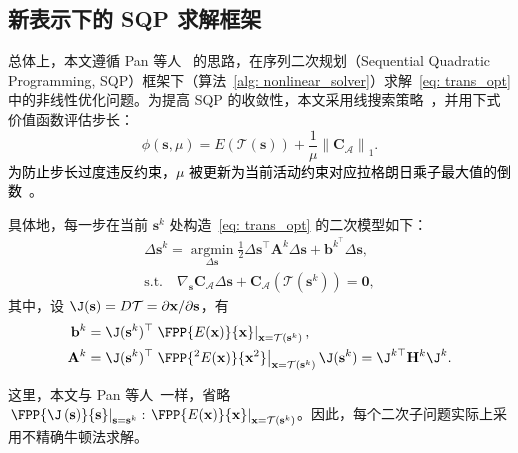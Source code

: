 \subsection{新表示下的 SQP 求解框架}
总体上，本文遵循 Pan 等人~\cite{pan_subspace_2015} 的思路，在序列二次规划（Sequential Quadratic Programming, SQP）框架下（算法~\ref{alg: nonlinear_solver}）求解~\cref{eq: trans_opt} 中的非线性优化问题。为提高 SQP 的收敛性，本文采用线搜索策略~\cite{nocedal1999numerical}，并用下式价值函数评估步长：
\begin{equation}
   \phi(\mathbf{s}, \mu) = E(\mathcal{T}(\mathbf{s})) + \frac{1}{\mu}\left\|\mathbf{C}_{\mathcal{A}} \right\|_{1}.
   \label{eq:merit_function}
\end{equation}
\textcolor{black}{
为防止步长过度违反约束，$\mu$ 被更新为当前活动约束对应拉格朗日乘子最大值的倒数~\cite{nocedal1999numerical}}。

具体地，每一步在当前 $\mathbf s^k$ 处构造~\cref{eq: trans_opt} 的二次模型如下：
\begin{equation}
\begin{gathered}
    \Delta {\mathbf{s}}^k =\mathop{\arg \min}\limits_{\Delta \mathbf s}
    \frac{1}{2}\Delta{\mathbf{s}}^{\top} \mathbf{A}^k \Delta {\mathbf{s}} +
    \mathbf{b}^{k^\top} \Delta {\mathbf{s}},\\
    \text{s.t.} \quad
    \nabla_{{\mathbf{s}}}\mathbf{C_{\mathcal A}}  \Delta{\mathbf{s}} + \mathbf{C_{\mathcal A}}(\mathcal{T}({\mathbf{s}}^k )) = \mathbf{0},
  \label{eq: quad_opt}
  \end{gathered}
\end{equation}
其中，设 $\J(\mathbf{s}) = D \mathcal{T} = \partial \mathbf{x}/\partial \mathbf{s}$，有
\begin{equation*}
\begin{split}
\mathbf{b}^k &= \J(\mathbf{s}^k)^\top \left
  .\FPP{E(\mathbf{x})}{\mathbf{x}}\right|_{\mathbf{x} =
  \mathcal{T}(\mathbf{s}^k)},\\
\mathbf{A}^k &= \J(\mathbf{s}^k)^\top \left.
  \FPP{^2E(\mathbf{x})}{\mathbf{x}^2}\right|_{\mathbf{x} = \mathcal{T}(\mathbf{s}^k)}
\J(\mathbf{s}^k) = \J^{k\top} \mathbf{H}^k \J^k.
\end{split}
\end{equation*}

这里，本文与 Pan 等人~\cite{pan_subspace_2015}一样，省略 $\left.\FPP{\J\left(\mathbf{s}\right)}{\mathbf{s}}\right|_{\mathbf s=\mathbf{s}^k}:\left.\FPP{E(\mathbf{x})} {\mathbf{x}}\right|_{\mathbf{x} = \mathcal{T}\left(\mathbf{s}^k\right)}$。因此，每个二次子问题实际上采用不精确牛顿法求解。

